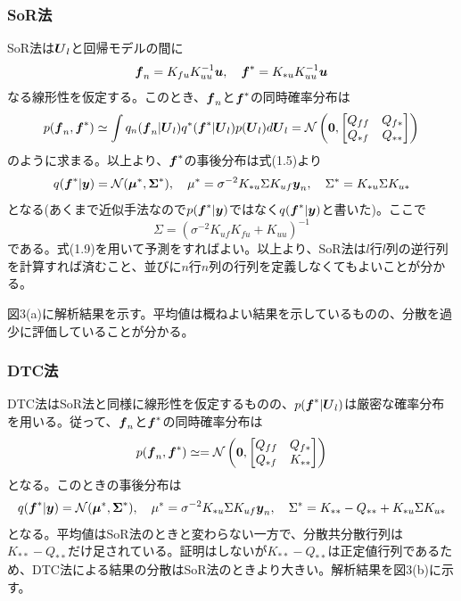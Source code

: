 \documentclass[dvipdfmx, 9pt, a4paper]{jsarticle}
\numberwithin{equation}{section}
\newcommand{\bm}[1]{{\mbox{\boldmath $#1$}}}
\begin{document}
\subsubsection{SoR法}
SoR法は$\bm U_l$と回帰モデルの間に
\begin{equation}
\bm f_n=K_{fu}K^{-1}_{uu}\bm u,~~~\bm f^*=K_{*u}K^{-1}_{uu}\bm u \notag
\end{equation}
なる線形性を仮定する。このとき、$\bm f_n$と$\bm f^*$の同時確率分布は
\begin{equation}
p(\bm f_n, \bm f^*) \simeq \int q_n(\bm f_n|\bm U_l)q^*(\bm f^*|\bm U_l)p(\bm U_l)d\bm U_l=\mathcal{N}
\left(\bm 0,
\begin{bmatrix}
Q_{ff} & Q_{f*} \\
Q_{*f} & Q_{**}
\end{bmatrix}
\right) \notag
\end{equation}
のように求まる。以上より、$\bm f^*$の事後分布は式(1.5)より
\begin{equation}
q(\bm f^*|\bm y)=\mathcal{N}(\bm \mu^*, \bm \Sigma^*),~~~\mu^*=\sigma^{-2}K_{*u}\Sigma K_{uf}\bm y_n,~~~\Sigma^*=K_{*u}\Sigma K_{u*}
\end{equation}
となる(あくまで近似手法なので$p(\bm f^*|\bm y)$ではなく$q(\bm f^*|\bm y)$と書いた)。ここで
\begin{equation}
\Sigma=(\sigma^{-2}K_{uf}K_{fu}+K_{uu})^{-1}
\end{equation}
である。式(1.9)を用いて予測をすればよい。以上より、SoR法は$l$行$l$列の逆行列を計算すれば済むこと、並びに$n$行$n$列の行列を定義しなくてもよいことが分かる。\par
図3(a)に解析結果を示す。平均値は概ねよい結果を示しているものの、分散を過少に評価していることが分かる。
\subsubsection{DTC法}
DTC法はSoR法と同様に線形性を仮定するものの、$p(\bm f^*|\bm U_l)$は厳密な確率分布を用いる。従って、$\bm f_n$と$\bm f^*$の同時確率分布は
\begin{equation}
p(\bm f_n, \bm f^*) \simeq =\mathcal{N}
\left(\bm 0,
\begin{bmatrix}
Q_{ff} & Q_{f*} \\
Q_{*f} & K_{**}
\end{bmatrix}
\right) \notag
\end{equation}
となる。このときの事後分布は
\begin{equation}
q(\bm f^*|\bm y)=\mathcal{N}(\bm \mu^*, \bm \Sigma^*),~~~\mu^*=\sigma^{-2}K_{*u}\Sigma K_{uf}\bm y_n,~~~\Sigma^*=K_{**}-Q_{**}+K_{*u}\Sigma K_{u*}
\end{equation}
となる。平均値はSoR法のときと変わらない一方で、分散共分散行列は$K_{**}-Q_{**}$だけ足されている。証明はしないが$K_{**}-Q_{**}$は正定値行列であるため、DTC法による結果の分散はSoR法のときより大きい。解析結果を図3(b)に示す。
\end{document}
